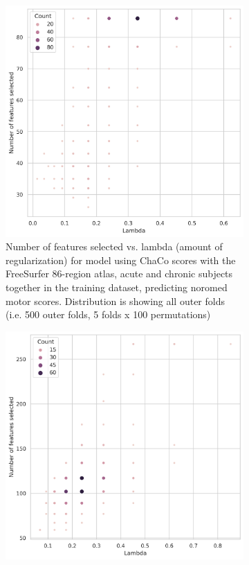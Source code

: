 \documentclass[10pt]{article}
\begin{document}
\begin{figure}
\begin{subfigure}{0.5\textwidth}
  \includegraphics[width=1\linewidth]{figures/fs86subj_normed_motor_scores_chacovol_acutechronic_ridge_crossval1nfeats_lambdas.png}
  \caption{Number of features selected vs. lambda (amount of regularization) for model using ChaCo scores with the FreeSurfer 86-region atlas, acute and chronic subjects together in the training dataset, predicting noromed motor scores. Distribution is showing all outer folds (i.e. 500 outer folds, 5 folds x 100 permutations)}
  \label{fig:sfig1}
\end{subfigure}
\begin{subfigure}{0.5\textwidth}
  \includegraphics[width=1\linewidth]{figures/shen268_normed_motor_scores_chacovol_acutechronic_ridge_crossval1nfeats_lambdas.png}

\end{subfigure}
\end{figure}
\end{document}
